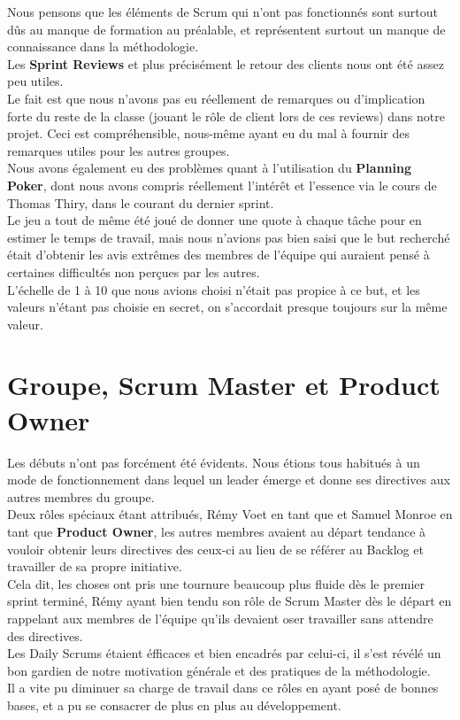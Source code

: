 \documentclass{report}
\begin{document}
		Nous pensons que les éléments de Scrum qui n'ont pas fonctionnés sont surtout dûs au manque de formation au préalable, et représentent surtout un manque de connaissance dans la méthodologie.\\

		Les \textbf{Sprint Reviews} et plus précisément le retour des clients nous ont été assez peu utiles.\\
		Le fait est que nous n'avons pas eu réellement de remarques ou d'implication forte du reste de la classe (jouant le rôle de client lors de ces reviews) dans notre projet. Ceci est compréhensible, nous-même ayant eu du mal à fournir des remarques utiles pour les autres groupes.\\

		Nous avons également eu des problèmes quant à l'utilisation du \textbf{Planning Poker}, dont nous avons compris réellement l'intérêt et l'essence via le cours de Thomas Thiry, dans le courant du dernier sprint.\\
		Le jeu a tout de même été joué de donner une quote à chaque tâche pour en estimer le temps de travail, mais nous n'avions pas bien saisi que le but recherché était d'obtenir les avis extrêmes des membres de l'équipe qui auraient pensé à certaines difficultés non perçues par les autres.\\
		L'échelle de 1 à 10 que nous avions choisi n'était pas propice à ce but, et les valeurs n'étant pas choisie en secret, on s'accordait presque toujours sur la même valeur.\\

	\section{Groupe, Scrum Master et Product Owner}

		Les débuts n'ont pas forcément été évidents. Nous étions tous habitués à un mode de fonctionnement dans lequel un leader émerge et donne ses directives aux autres membres du groupe.\\
		Deux rôles spéciaux étant attribués, Rémy Voet en tant que  et Samuel Monroe en tant que \textbf{Product Owner}, les autres membres avaient au départ tendance à vouloir obtenir leurs directives des ceux-ci au lieu de se référer au Backlog et travailler de sa propre initiative.\\

		Cela dit, les choses ont pris une tournure beaucoup plus fluide dès le premier sprint terminé, Rémy ayant bien tendu son rôle de Scrum Master dès le départ en rappelant aux membres de l'équipe qu'ils devaient oser travailler sans attendre des directives.\\
		Les Daily Scrums étaient éfficaces et bien encadrés par celui-ci, il s'est révélé un bon gardien de notre motivation générale et des pratiques de la méthodologie.\\
		Il a vite pu diminuer sa charge de travail dans ce rôles en ayant posé de bonnes bases, et a pu se consacrer de plus en plus au développement.\\
\end{document}
